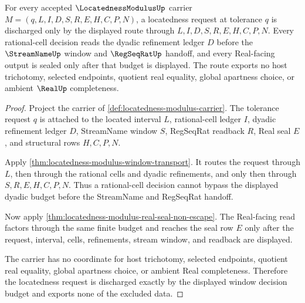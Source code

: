 \begin{theorem}
\label{thm:locatedness-modulus-obligation-window-decision-budget}
For every accepted $\LocatednessModulusUp$ carrier $M=(q,L,I,D,S,R,E,H,C,P,N)$, a locatedness request at tolerance $q$ is discharged only by the displayed route through $L,I,D,S,R,E,H,C,P,N$. Every rational-cell decision reads the dyadic refinement ledger $D$ before the $\StreamNameUp$ window and $\RegSeqRatUp$ handoff, and every Real-facing output is sealed only after that budget is displayed. The route exports no host trichotomy, selected endpoints, quotient real equality, global apartness choice, or ambient $\RealUp$ completeness.
\end{theorem}
\begin{proof}
Project the carrier of \autoref{def:locatedness-modulus-carrier}. The tolerance request $q$ is attached to the located interval $L$, rational-cell ledger $I$, dyadic refinement ledger $D$, StreamName window $S$, RegSeqRat readback $R$, Real seal $E$, and structural rows $H,C,P,N$.

Apply \autoref{thm:locatedness-modulus-window-transport}. It routes the request through $L$, then through the rational cells and dyadic refinements, and only then through $S,R,E,H,C,P,N$. Thus a rational-cell decision cannot bypass the displayed dyadic budget before the StreamName and RegSeqRat handoff.

Now apply \autoref{thm:locatedness-modulus-real-seal-non-escape}. The Real-facing read factors through the same finite budget and reaches the seal row $E$ only after the request, interval, cells, refinements, stream window, and readback are displayed.

The carrier has no coordinate for host trichotomy, selected endpoints, quotient real equality, global apartness choice, or ambient Real completeness. Therefore the locatedness request is discharged exactly by the displayed window decision budget and exports none of the excluded data.
\end{proof}

